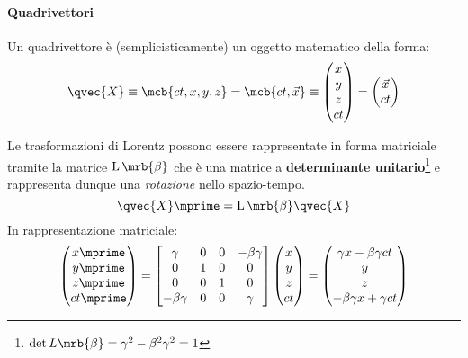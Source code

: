 \paragraph{Quadrivettori}
Un quadrivettore è (semplicisticamente) un oggetto matematico della forma:
\begin{equation}
	\qvec{X} \equiv
	\mcb{ct, x, y, z}
	= \mcb{ct, \vec{x}}
	\equiv
	\begin{pmatrix}
		x \\
		y \\
		z \\
		ct
	\end{pmatrix}
	=
	\begin{pmatrix}
		\vec{x} \\
		ct
	\end{pmatrix}
\end{equation}

Le trasformazioni di Lorentz possono essere rappresentate in forma matriciale
tramite la matrice $\operatorname{L}\mrb{\beta}$ che è una matrice a
\textbf{determinante unitario}\footnote{
	$\det L \mrb{\beta} = \gamma ^{2} - \beta ^{2} \gamma ^{2} = 1$
} e rappresenta dunque una \textit{rotazione} nello spazio-tempo.
\begin{equation}
	\qvec{X}\mprime = \operatorname{L}\mrb{\beta} \qvec{X}
\end{equation}
In rappresentazione matriciale:
\begin{equation}
	\begin{pmatrix}
		x \mprime \\
		y \mprime \\
		z \mprime \\
		ct \mprime
	\end{pmatrix} =
	\begin{bmatrix}
		\gamma        & 0 & 0 & -\beta \gamma \\
		0             & 1 & 0 & 0             \\
		0             & 0 & 1 & 0             \\
		-\beta \gamma & 0 & 0 & \gamma
	\end{bmatrix}
	\begin{pmatrix}
		x \\
		y \\
		z \\
		ct
	\end{pmatrix}
	=
	\begin{pmatrix}
		\gamma x - \beta \gamma ct \\
		y                          \\
		z                          \\
		-\beta \gamma x + \gamma ct
	\end{pmatrix}
\end{equation}

